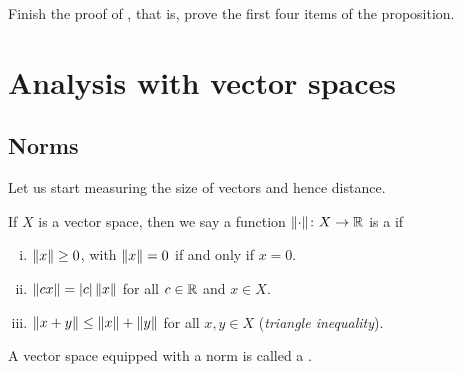 \begin{exercise}[Easy] \label{exercise:LXYvs}
Finish the proof of , that is, prove the first four
items of the proposition.
\end{exercise}


\sectionnewpage
\section{Analysis with vector spaces}
\label{sec:normsmatsdets}



\subsection{Norms}

Let us start measuring the size of vectors and hence distance.

\begin{defn}
If $X$ is a vector space, then we say
a function $\lVert {\cdot} \rVert \colon X \to {\mathbb{R}}$ is a
\emph{} if
\begin{enumerate}[(i)]
\item \label{defn:norm:i} $\lVert {x} \rVert \geq 0$, with $\lVert {x} \rVert=0$ if and only if $x=0$.
\item \label{defn:norm:ii} $\lVert {cx} \rVert = \lvert {c} \rvert \, \lVert {x} \rVert$ for all $c \in {\mathbb{R}}$ and $x \in X$.
\item \label{defn:norm:iii} $\lVert {x+y} \rVert \leq \lVert {x} \rVert+\lVert {y} \rVert$ for all
$x,y \in X$
\qquad (\emph{triangle inequality}).
\end{enumerate}
A vector space equipped with a norm is called a
\emph{}.
\end{defn}

